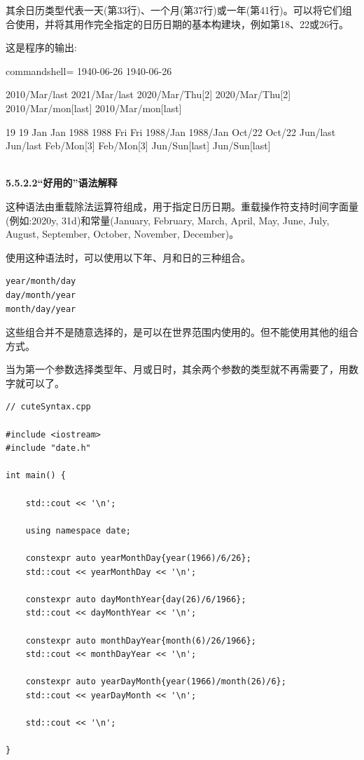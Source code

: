 其余日历类型代表一天(第33行)、一个月(第37行)或一年(第41行)。可以将它们组合使用，并将其用作完全指定的日历日期的基本构建块，例如第18、22或26行。

这是程序的输出:

\begin{tcblisting}{commandshell={}}
1940-06-26 1940-06-26

2010/Mar/last 2021/Mar/last
2020/Mar/Thu[2] 2020/Mar/Thu[2]
2010/Mar/mon[last] 2010/Mar/mon[last]

19 19
Jan Jan
1988 1988
Fri Fri
1988/Jan 1988/Jan
Oct/22 Oct/22
Jun/last Jun/last
Feb/Mon[3] Feb/Mon[3]
Jun/Sun[last] Jun/Sun[last]
\end{tcblisting}

\hspace*{\fill} \\ %
\noindent
\textbf{5.5.2.2\hspace{0.2cm}“好用的”语法解释}

这种语法由重载除法运算符组成，用于指定日历日期。重载操作符支持时间字面量(例如:2020y, 31d)和常量(January, February, March, April, May, June, July, August, September, October, November, December)。

使用这种语法时，可以使用以下年、月和日的三种组合。

\begin{lstlisting}[style=styleCXX]
year/month/day
day/month/year
month/day/year
\end{lstlisting}

这些组合并不是随意选择的，是可以在世界范围内使用的。但不能使用其他的组合方式。

当为第一个参数选择类型年、月或日时，其余两个参数的类型就不再需要了，用数字就可以了。

\begin{lstlisting}[style=styleCXX]
// cuteSyntax.cpp

#include <iostream>
#include "date.h"

int main() {
	
	std::cout << '\n';
	
	using namespace date;
	
	constexpr auto yearMonthDay{year(1966)/6/26};
	std::cout << yearMonthDay << '\n';
	
	constexpr auto dayMonthYear{day(26)/6/1966};
	std::cout << dayMonthYear << '\n';
	
	constexpr auto monthDayYear{month(6)/26/1966};
	std::cout << monthDayYear << '\n';
	
	constexpr auto yearDayMonth{year(1966)/month(26)/6};
	std::cout << yearDayMonth << '\n';
	
	std::cout << '\n';

}
\end{lstlisting}

